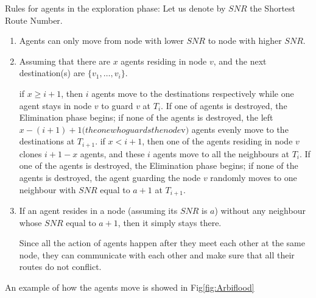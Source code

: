 Rules for agents in the exploration phase:
Let us denote by $SNR$ the Shortest Route Number.
\begin{enumerate}
\item Agents can only move from node with lower $SNR$ to node with higher $SNR$.
\item Assuming that there are $x$ agents residing in node $v$, and the next destination(s) are $\{v_1,\ldots, v_i\}$. 

        if $x\geq i+1$, then $i$ agents move to the destinations respectively while one agent stays in node $v$ to guard $v$ at $T_i$. If one of agents is destroyed, the Elimination phase begins; if none of the agents is destroyed, the left $x-(i+1)+1(the one who guards the node $v$)$ agents evenly move to the destinations at $T_{i+1}$. 
        if $x< i+1$, then one of the agents residing in node $v$ clones $i+1-x$ agents, and these $i$ agents move to all the neighbours at $T_i$. If one of the agents is destroyed, the Elimination phase begins; if none of the agents is destroyed, the agent guarding the node $v$ randomly moves to one neighbour with $SNR$ equal to $a+1$ at $T_{i+1}$.
\item If an agent resides in a node (assuming its $SNR$ is $a$) without any neighbour whose $SNR$ equal to $a+1$, then it simply stays there.
 
        Since all the action of agents happen after they meet each other at the same node, they can communicate with each other and make sure that all their routes do not conflict.
\end{enumerate}
An example of how the agents move is showed in Fig\ref{fig:Arbiflood}
